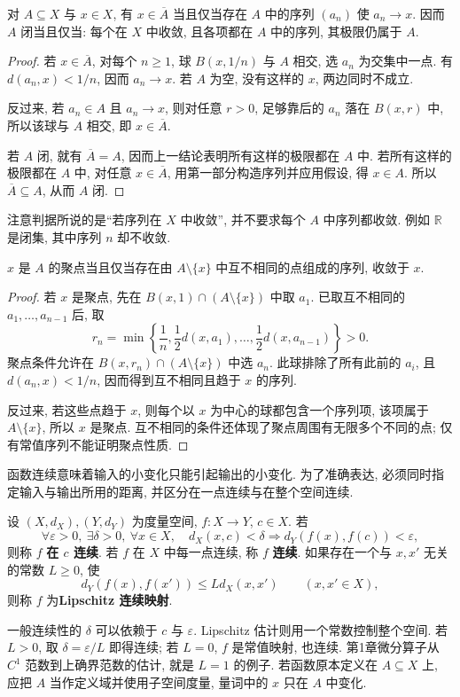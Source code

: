 \begin{theorem}[闭包与闭集的序列判据]\label{ch:seq:closure-sequences}
对 $A\subseteq X$ 与 $x\in X$, 有 $x\in\overline A$ 当且仅当存在 $A$ 中的序列 $(a_n)$ 使 $a_n\to x$. 因而 $A$ 闭当且仅当: 每个在 $X$ 中收敛, 且各项都在 $A$ 中的序列, 其极限仍属于 $A$.
\end{theorem}
\begin{proof}
若 $x\in\overline A$, 对每个 $n\ge1$, 球 $B(x,1/n)$ 与 $A$ 相交, 选 $a_n$ 为交集中一点. 有 $d(a_n,x)<1/n$, 因而 $a_n\to x$. 若 $A$ 为空, 没有这样的 $x$, 两边同时不成立.

反过来, 若 $a_n\in A$ 且 $a_n\to x$, 则对任意 $r>0$, 足够靠后的 $a_n$ 落在 $B(x,r)$ 中, 所以该球与 $A$ 相交, 即 $x\in\overline A$.

若 $A$ 闭, 就有 $\overline A=A$, 因而上一结论表明所有这样的极限都在 $A$ 中. 若所有这样的极限都在 $A$ 中, 对任意 $x\in\overline A$, 用第一部分构造序列并应用假设, 得 $x\in A$. 所以 $\overline A\subseteq A$, 从而 $A$ 闭.
\end{proof}
注意判据所说的是``若序列在 $X$ 中收敛'', 并不要求每个 $A$ 中序列都收敛. 例如 $\mathbb{R}$ 是闭集, 其中序列 $n$ 却不收敛.

\begin{proposition}[聚点的序列判据]\label{ch:seq:accumulation-sequences}
$x$ 是 $A$ 的聚点当且仅当存在由 $A\setminus\{x\}$ 中互不相同的点组成的序列, 收敛于 $x$.
\end{proposition}
\begin{proof}
若 $x$ 是聚点, 先在 $B(x,1)\cap(A\setminus\{x\})$ 中取 $a_1$. 已取互不相同的 $a_1,\ldots,a_{n-1}$ 后, 取
\[
 r_n=\min\left\{\frac1n,\frac12d(x,a_1),\ldots,
 \frac12d(x,a_{n-1})\right\}>0.
\]
聚点条件允许在 $B(x,r_n)\cap(A\setminus\{x\})$ 中选 $a_n$. 此球排除了所有此前的 $a_i$, 且 $d(a_n,x)<1/n$, 因而得到互不相同且趋于 $x$ 的序列.

反过来, 若这些点趋于 $x$, 则每个以 $x$ 为中心的球都包含一个序列项, 该项属于 $A\setminus\{x\}$, 所以 $x$ 是聚点. 互不相同的条件还体现了聚点周围有无限多个不同的点; 仅有常值序列不能证明聚点性质.
\end{proof}

\label{ch:seq:continuity}
函数连续意味着输入的小变化只能引起输出的小变化. 为了准确表达, 必须同时指定输入与输出所用的距离, 并区分在一点连续与在整个空间连续.

\begin{definition}\label{ch:seq:def-continuity}
设 $(X,d_X),(Y,d_Y)$ 为度量空间, $f:X\to Y$, $c\in X$. 若
\[
 \forall\varepsilon>0,\ \exists\delta>0,\
 \forall x\in X,\quad
 d_X(x,c)<\delta\Longrightarrow d_Y(f(x),f(c))<\varepsilon,
\]
则称 $f$ \textbf{在 $c$ 连续}. 若 $f$ 在 $X$ 中每一点连续, 称 $f$ \textbf{连续}. 如果存在一个与 $x,x'$ 无关的常数 $L\ge0$, 使
\[
 d_Y(f(x),f(x'))\le Ld_X(x,x')\qquad(x,x'\in X),
\]
则称 $f$ 为\textbf{Lipschitz 连续映射}.
\end{definition}
一般连续性的 $\delta$ 可以依赖于 $c$ 与 $\varepsilon$. Lipschitz 估计则用一个常数控制整个空间. 若 $L>0$, 取 $\delta=\varepsilon/L$ 即得连续; 若 $L=0$, $f$ 是常值映射, 也连续. 第1章微分算子从 $C^1$ 范数到上确界范数的估计, 就是 $L=1$ 的例子. 若函数原本定义在 $A\subseteq X$ 上, 应把 $A$ 当作定义域并使用子空间度量, 量词中的 $x$ 只在 $A$ 中变化.

